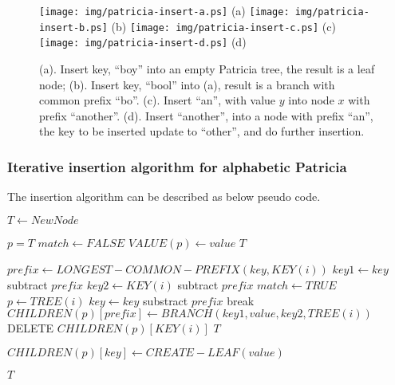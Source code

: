 \documentclass{article}
\begin{document}
\begin{figure}[htbp]
       \begin{center}
	\texttt{[image: img/patricia-insert-a.ps]} (a)
	\texttt{[image: img/patricia-insert-b.ps]} (b)
	\texttt{[image: img/patricia-insert-c.ps]} (c)
	\texttt{[image: img/patricia-insert-d.ps]} (d)
        \caption{(a). Insert key, ``boy'' into an empty Patricia tree,
	the result is a leaf node; \newline
	(b). Insert key, ``bool'' into (a), result is a branch with
	common prefix ``bo''. \newline
        (c). Insert ``an'', with value $y$ into node $x$ with prefix
	``another''. \newline
        (d). Insert ``another'', into a node with prefix ``an'', the key to be inserted update to ``other'', and do further insertion.}
        \label{fig:patricia-insert}
       \end{center}
\end{figure}

\subsubsection{Iterative insertion algorithm for alphabetic Patricia}

The insertion algorithm can be described as below pseudo code.

\begin{algorithmic}[1]
   \State $T \leftarrow NewNode$ \EndIf

  \State $p=T$
  \Loop
    \State $match \leftarrow FALSE$
        \State $VALUE(p) \leftarrow value$
        \State \Return $T$
      \EndIf

      \State $prefix \leftarrow LONGEST-COMMON-PREFIX(key, KEY(i))$
      \State $key1 \leftarrow key$ subtract $prefix$
      \State $key2 \leftarrow KEY(i)$ subtract $prefix$
        \State $match \leftarrow TRUE$
          \State $p \leftarrow TREE(i)$
          \State $key \leftarrow key$ substract $prefix$
          \State break
        \Else
          \State $CHILDREN(p)[prefix] \leftarrow BRANCH(key1, value, key2, TREE(i))$
          \State DELETE $CHILDREN(p)[KEY(i)]$
          \State \Return $T$
        \EndIf
      \EndIf

        \State $CHILDREN(p)[key] \leftarrow CREATE-LEAF(value)$
      \EndIf
    \EndFor

  \EndLoop
  \State \Return $T$
\EndFunction
\end{algorithmic}
\end{document}
